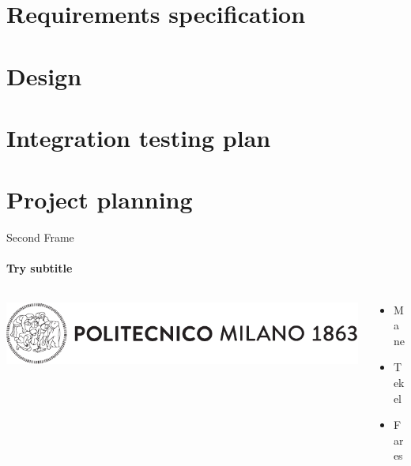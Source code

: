 \documentclass{beamer}
\begin{document}




   \section{Requirements specification} 




   \section{Design}




   \section{Integration testing plan}




   \section{Project planning}










\begin{frame}{Second Frame}
\framesubtitle{Try subtitle}
\begin{columns}
      \begin{column}{0.4\textwidth}
\includegraphics[width=\columnwidth]{img/logopolimi}
      \end{column}
      \begin{column}{0.4\textwidth}
         \begin{itemize}
            \item Mane
\item Tekel
            \item Fares
         \end{itemize}
      \end{column}
   \end{columns}
\end{frame}
\end{document}
